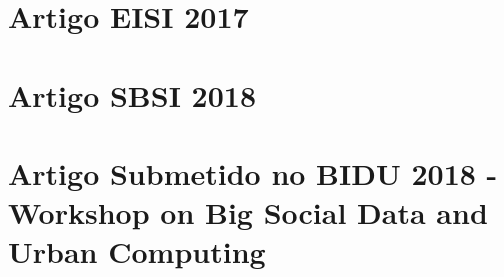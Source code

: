 
\begin{anexosenv}

\partanexos

\chapter{Artigo EISI 2017}

%


\chapter{Artigo SBSI 2018}


\chapter{Artigo Submetido no BIDU 2018 - Workshop on Big Social Data and Urban Computing}


\end{anexosenv}